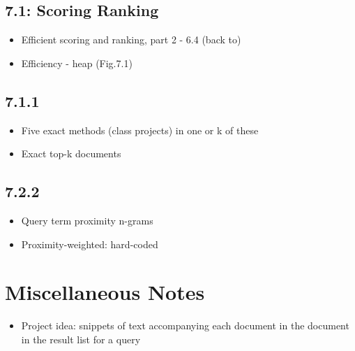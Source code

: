 \documentclass{article}
\begin{document}
\subsection{7.1: Scoring Ranking}
\begin{itemize}
	\item Efficient scoring and ranking, part 2 - 6.4 (back to)
	\item Efficiency - heap (Fig.7.1)
\end{itemize}{}
\subsection{7.1.1}
\begin{itemize}
	\item Five exact methods (class projects) in one or k of these
	\item Exact top-k documents
\end{itemize}{}
\subsection{7.2.2}
\begin{itemize}
	\item Query term proximity n-grams
	\item Proximity-weighted: hard-coded
\end{itemize}{}


\section{Miscellaneous Notes}
\begin{itemize}
	\item Project idea: snippets of text accompanying each document in the document in the result list for a query
\end{itemize}{}
\end{document}
